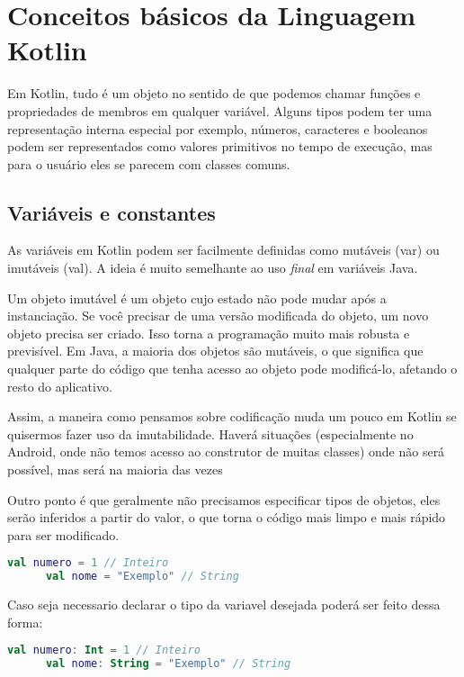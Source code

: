 

\chapter{ Conceitos b\'{a}sicos da Linguagem Kotlin}

Em Kotlin, tudo é um objeto no sentido de que 
podemos chamar funções e propriedades de membros
 em qualquer variável. Alguns tipos podem ter uma 
 representação interna especial por exemplo, 
 números, caracteres e booleanos podem ser 
 representados como valores primitivos no tempo 
 de execução, mas para o usuário eles se parecem
 com classes comuns.

    \section{Vari\'{a}veis e constantes}
      As variáveis em Kotlin podem ser facilmente 
    definidas como mutáveis (var) ou imutáveis (val).
    A ideia é muito semelhante ao uso \emph{final} em variáveis Java.
     
    Um objeto imutável é um objeto cujo estado não pode mudar 
    após a instanciação. Se você precisar de uma versão 
    modificada do objeto, um novo objeto precisa ser criado.
    Isso torna a programação muito mais robusta e previsível. 
    Em Java, a maioria dos objetos são mutáveis, o que significa
    que qualquer parte do código que tenha acesso ao objeto pode 
    modificá-lo, afetando o resto do aplicativo.

    Assim, a maneira como pensamos sobre codificação muda um pouco em Kotlin 
    se quisermos fazer uso da imutabilidade. Haverá situações (especialmente no Android,
    onde não temos acesso ao construtor de muitas classes) onde não será 
    possível, mas será na maioria das vezes

    Outro ponto é que geralmente não precisamos 
    especificar tipos de objetos, eles serão inferidos a partir do 
    valor, o que torna o código mais limpo e mais rápido para ser modificado.
    \begin{lstlisting}[label={lst:example1}, language=Kotlin]
      val numero = 1 // Inteiro
      val nome = "Exemplo" // String  
    \end{lstlisting}
    Caso seja necessario declarar o tipo da variavel desejada poderá ser feito dessa forma:
    \begin{lstlisting}[label={lst:example1}, language=Kotlin]
      val numero: Int = 1 // Inteiro
      val nome: String = "Exemplo" // String  
    \end{lstlisting}

